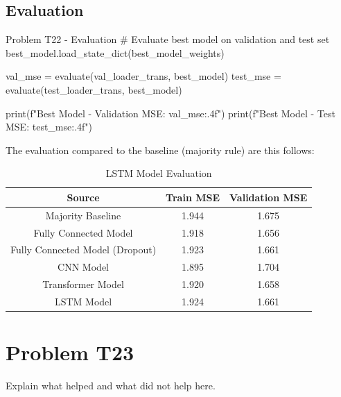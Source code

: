 \documentclass[12pt, a4paper]{article}
\begin{document}
            \subsection{Evaluation}
                \begin{codeblock}{Problem T22 - Evaluation}
                    # Evaluate best model on validation and test set
                    best_model.load_state_dict(best_model_weights)

                    val_mse = evaluate(val_loader_trans, best_model)
                    test_mse = evaluate(test_loader_trans, best_model)

                    print(f"Best Model - Validation MSE: {val_mse:.4f}")
                    print(f"Best Model - Test MSE: {test_mse:.4f}")
                \end{codeblock}

                \noindent The evaluation compared to the baseline (majority rule) are this follows:
                \begin{table}[h]
                    \centering
                    \begin{tabular}{|c|c|c|}
                        \hline
                        \textbf{Source} & \textbf{Train MSE} & \textbf{Validation MSE} \\
                        \hline \hline
                        Majority Baseline & 1.944 & 1.675 \\
                        Fully Connected Model & 1.918 & 1.656 \\
                        Fully Connected Model (Dropout) & 1.923 & 1.661 \\
                        CNN Model & 1.895 & 1.704 \\
                        Transformer Model & 1.920 & 1.658 \\
                        LSTM Model & 1.924 & 1.661 \\
                        \hline
                    \end{tabular}
                    \caption{LSTM Model Evaluation}
                \end{table}

	\pagebreak

        \section{Problem T23}
            Explain what helped and what did not help here.
\end{document}
